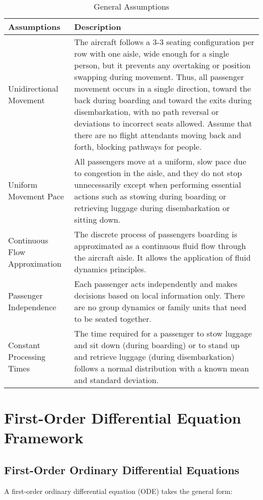 \documentclass[12pt,a4paper]{article}
\begin{document}
\begin{table}[H]
\centering
\begin{tabular}{|p{3cm}|p{11cm}|}
\hline
\textbf{Assumptions} & \textbf{Description} \\ \hline
Unidirectional Movement & The aircraft follows a 3-3 seating configuration per row with one aisle, wide enough for a single person, but it prevents any overtaking or position swapping during movement. Thus, all passenger movement occurs in a single direction, toward the back during boarding and toward the exits during disembarkation, with no path reversal or deviations to incorrect seats allowed. Assume that there are no flight attendants moving back and forth, blocking pathways for people. \\ \hline
Uniform Movement Pace & All passengers move at a uniform, slow pace due to congestion in the aisle, and they do not stop unnecessarily except when performing essential actions such as stowing during boarding or retrieving luggage during disembarkation or sitting down. \\ \hline
Continuous Flow Approximation & The discrete process of passengers boarding is approximated as a continuous fluid flow through the aircraft aisle. It allows the application of fluid dynamics principles. \\ \hline
Passenger Independence & Each passenger acts independently and makes decisions based on local information only. There are no group dynamics or family units that need to be seated together. \\ \hline
Constant Processing Times & The time required for a passenger to stow luggage and sit down (during boarding) or to stand up and retrieve luggage (during disembarkation) follows a normal distribution with a known mean and standard deviation. \\ \hline
\end{tabular}
\caption{General Assumptions}
\label{tab:assumptions}
\end{table}

\section{First-Order Differential Equation Framework}
\subsection{First-Order Ordinary Differential Equations}

A first-order ordinary differential equation (ODE) takes the general form:
\end{document}
